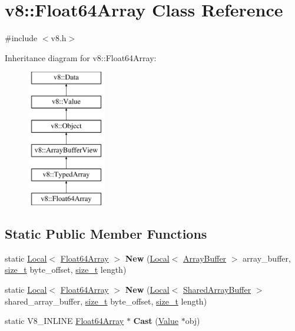 \hypertarget{classv8_1_1Float64Array}{}\section{v8\+:\+:Float64\+Array Class Reference}
\label{classv8_1_1Float64Array}


{\ttfamily \#include $<$v8.\+h$>$}

Inheritance diagram for v8\+:\+:Float64\+Array\+:\begin{figure}[H]
\begin{center}
\leavevmode
\includegraphics[height=6.000000cm]{classv8_1_1Float64Array}
\end{center}
\end{figure}
\subsection*{Static Public Member Functions}
\begin{DoxyCompactItemize}
\item 
\mbox{\label{classv8_1_1Float64Array_a6e12e5ced578a357cfd049e036c4d6d6}} 
static \mbox{\hyperlink{classv8_1_1Local}{Local}}$<$ \mbox{\hyperlink{classv8_1_1Float64Array}{Float64\+Array}} $>$ {\bfseries New} (\mbox{\hyperlink{classv8_1_1Local}{Local}}$<$ \mbox{\hyperlink{classv8_1_1ArrayBuffer}{Array\+Buffer}} $>$ array\+\_\+buffer, \mbox{\hyperlink{classsize__t}{size\+\_\+t}} byte\+\_\+offset, \mbox{\hyperlink{classsize__t}{size\+\_\+t}} length)
\item 
\mbox{\label{classv8_1_1Float64Array_aff414a8613e468f7deb29996f049e130}} 
static \mbox{\hyperlink{classv8_1_1Local}{Local}}$<$ \mbox{\hyperlink{classv8_1_1Float64Array}{Float64\+Array}} $>$ {\bfseries New} (\mbox{\hyperlink{classv8_1_1Local}{Local}}$<$ \mbox{\hyperlink{classv8_1_1SharedArrayBuffer}{Shared\+Array\+Buffer}} $>$ shared\+\_\+array\+\_\+buffer, \mbox{\hyperlink{classsize__t}{size\+\_\+t}} byte\+\_\+offset, \mbox{\hyperlink{classsize__t}{size\+\_\+t}} length)
\item 
\mbox{\label{classv8_1_1Float64Array_a936ee8e8cb2cb892cc5369e3ee6a7784}} 
static V8\+\_\+\+I\+N\+L\+I\+NE \mbox{\hyperlink{classv8_1_1Float64Array}{Float64\+Array}} $\ast$ {\bfseries Cast} (\mbox{\hyperlink{classv8_1_1Value}{Value}} $\ast$obj)
\end{DoxyCompactItemize}
